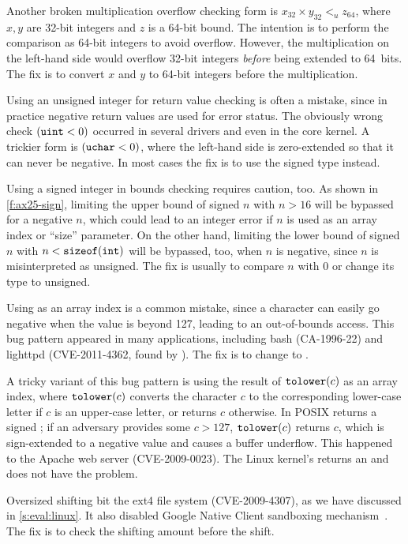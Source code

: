 Another broken multiplication overflow checking form is $x_{32}
\times y_{32} <_u z_{64}$, where $x, y$ are 32-bit integers and $z$
is a 64-bit bound.  The intention is to perform the comparison as
64-bit integers to avoid overflow.  However, the multiplication on
the left-hand side would overflow 32-bit integers \emph{before}
being extended to 64~bits.  The fix is to convert $x$ and $y$ to
64-bit integers before the multiplication.

Using an unsigned integer for return value checking is often a mistake,
since in practice negative return values are used for error status.
The obviously wrong check $(\texttt{uint} < 0)$ occurred in several
drivers and even in the core kernel.  A trickier form is $(\texttt{uchar}
< 0)$, where the left-hand side is zero-extended so that it can
never be negative.  In most cases the fix is to use the signed type
instead.

Using a signed integer in bounds checking requires caution, too.  As
shown in \autoref{f:ax25-sign}, limiting the upper bound of signed
$n$ with $n > 16$ will be bypassed for a negative $n$, which could
lead to an integer error if $n$ is used as an array index or ``size''
parameter.  On the other hand, limiting the lower bound of signed
$n$ with $n < \texttt{sizeof}(\texttt{int})$ will be bypassed, too, when
$n$ is negative, since $n$ is misinterpreted as unsigned.  The fix
is usually to compare $n$ with 0 or change its type to unsigned.

Using  as an array index is a common mistake, since a
character can easily go negative when the value is beyond 127,
leading to an out-of-bounds access.  This bug pattern appeared
in many applications, including bash (CA-1996-22) and
lighttpd (CVE-2011-4362, found by \sys).  The fix is to
change  to .

A tricky variant of this bug pattern is using the result of
$\texttt{tolower}(c)$ as an array index, where $\texttt{tolower}(c)$ converts
the character $c$ to the corresponding lower-case letter if $c$ is
an upper-case letter, or returns $c$ otherwise.  In POSIX 
returns a signed ; if an adversary provides some $c > 127$,
$\texttt{tolower}(c)$ returns $c$, which is sign-extended to a negative
value and causes a buffer underflow.  This happened to the
Apache web server (CVE-2009-0023).  The Linux kernel's 
returns an  and does not have the problem.

Oversized shifting bit the ext4 file system (CVE-2009-4307),
as we have discussed in \autoref{s:eval:linux}.
It also disabled Google Native Client sandboxing mechanism~\cite{nacl}.
The fix is to check the shifting amount before the shift.

